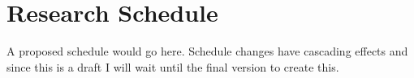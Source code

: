 \section{Research Schedule}

A proposed schedule would go here. Schedule changes have cascading effects and since this is a draft I will wait until the final version to create this.
